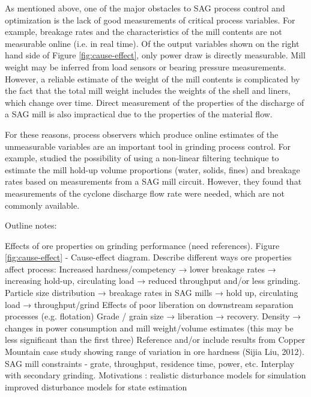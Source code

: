 As mentioned above, one of the major obstacles to SAG process control and optimization is the lack of good measurements of critical process variables. For example, breakage rates and the characteristics of the mill contents are not measurable online (i.e. in real time). Of the output variables shown on the right hand side of Figure \ref{fig:cause-effect}, only power draw is directly measurable. Mill weight may be inferred from load sensors or bearing pressure measurements. However, a reliable estimate of the weight of the mill contents is complicated by the fact that the total mill weight includes the weights of the shell and liners, which change over time. Direct measurement of the properties of the discharge of a SAG mill is also impractical due to the properties of the material flow.

For these reasons, process observers which produce online estimates of the unmeasurable variables are an important tool in grinding process control. For example, \cite{le_roux_state_2016} studied the possibility of using a non-linear filtering technique to estimate the mill hold-up volume proportions (water, solids, fines) and breakage rates based on measurements from a SAG mill circuit. However, they found that measurements of the cyclone discharge flow rate were needed, which are not commonly available.

Outline notes:

\begin{outline}
	\1 Effects of ore properties on grinding performance (need references).
	\1 Figure \ref{fig:cause-effect} - Cause-effect diagram.  Describe different ways ore properties affect process:
	\2 Increased hardness/competency → lower breakage rates → increasing hold-up, circulating load → reduced throughput and/or less grinding.
	\2 Particle size distribution → breakage rates in SAG mills → hold up, circulating load → throughput/grind
	\2 Effects of poor liberation on downstream separation processes (e.g. flotation)
	\2 Grade / grain size → liberation → recovery.
	\2 Density → changes in power consumption and mill weight/volume estimates (this may be less significant than the first three)
	\1 Reference and/or include results from Copper Mountain case study showing range of variation in ore hardness (Sijia Liu, 2012).
	\1 SAG mill constraints - grate, throughput, residence time, power, etc. Interplay with secondary grinding.
	\1 Motivations :
	\2 realistic disturbance models for simulation
	\2 improved disturbance models for state estimation
\end{outline}

